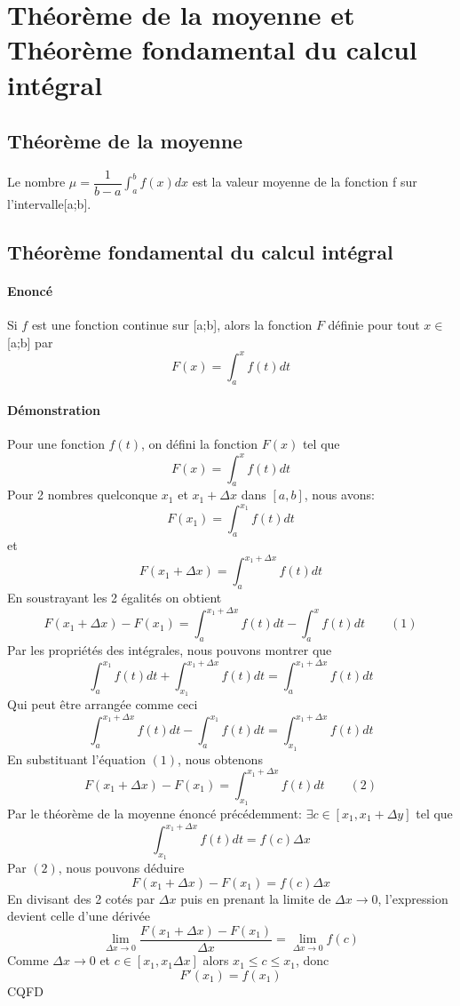 \documentclass[12pt,a4paper]{report}
\begin{document}
	\chapter[Analyse]{Théorème de la moyenne et Théorème fondamental du calcul intégral}
	\section*{Théorème de la moyenne}
	
	Le nombre $\mu=\dfrac{1}{b-a} \displaystyle \int_{a}^{b}f(x)dx$ est la valeur moyenne de la fonction f sur l'intervalle[a;b].
	\section*{Théorème fondamental du calcul intégral}
	\subsubsection*{Enoncé}
	Si $f$ est une fonction continue sur [a;b], alors la fonction $F$ définie pour tout $x \in$ [a;b] par \[F(x)=\int_{a}^{x}f(t)dt \]
	\subsubsection*{Démonstration}
	Pour une fonction $f(t)$, on défini la fonction $F(x)$ tel que
	\[F(x)=\int_{a}^{x}f(t)dt\]
	Pour 2 nombres quelconque $x_1$ et $x_1 + \Delta x$ dans $[a,b]$, nous avons:
	\[F(x_1)=\int_{a}^{x_1}f(t)dt\]
	et
	\[F(x_1+\Delta x)=\int_{a}^{x_1 + \Delta x}f(t)dt\]
	En soustrayant les 2 égalités on obtient
	\[F(x_1+\Delta x) - F(x_1) = \int_{a}^{x_1 + \Delta x}f(t)dt - \int_{a}^{x}f(t)dt \qquad (1)\]
	Par les propriétés des intégrales, nous pouvons montrer que
	\[\int_{a}^{x_1}f(t)dt+\int_{x_1}^{x_1+\Delta x}f(t)dt=\int_{a}^{x_1+\Delta x}f(t)dt\]
	Qui peut être arrangée comme ceci
	\[\int_{a}^{x_1+\Delta x}f(t)dt-\int_{a}^{x_1}f(t)dt=\int_{x_1}^{x_1+\Delta x}f(t)dt\]
	En substituant l'équation $(1)$, nous obtenons
	\[F(x_1+\Delta x) - F(x_1)=\int_{x_1}^{x_1+\Delta x}f(t)dt \qquad (2)\]
	Par le théorème de la moyenne énoncé précédemment: $\exists c \in [x_1,x_1+\Delta y]$ tel que
	\[\int_{x_1}^{x_1+\Delta x}f(t)dt=f(c)\Delta x\]
	Par $(2)$, nous pouvons déduire
	\[F(x_1+\Delta x) - F(x_1)=f(c)\Delta x\]
	En divisant des 2 cotés par $\Delta x$ puis en prenant la limite de $\Delta x \rightarrow 0$, l'expression devient celle d'une dérivée
	\[\lim_{\Delta x \rightarrow 0}\dfrac{F(x_1+\Delta x) - F(x_1)}{\Delta x}=\lim_{\Delta x \rightarrow 0}f(c)\]
	Comme $\Delta x \rightarrow 0$ et $c\in[x_1,x_1 \Delta x]$ alors $x_1\leq c\leq x_1$, donc
	\[F'(x_1)=f(x_1) \] CQFD
\end{document}
